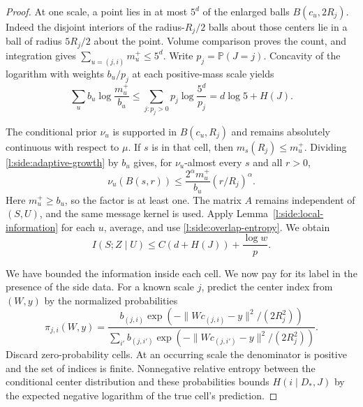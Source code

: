 \begin{proof}
At one scale, a point lies in at most $5^d$ of the enlarged balls
$B(c_u,2R_j)$.  Indeed the disjoint interiors of the radius-$R_j/2$
balls about those centers lie in a ball of radius $5R_j/2$ about the
point.  Volume comparison proves the count, and integration gives
$\sum_{u=(j,i)}m_u^+\le5^d$.  Write $p_j=\mathbb P(J=j)$.  Concavity of
the logarithm with weights $b_u/p_j$ at each positive-mass scale yields
\begin{equation}\label{l:side:overlap-entropy}
 \sum_u b_u\log\frac{m_u^+}{b_u}
 \le\sum_{j:p_j>0}p_j\log\frac{5^d}{p_j}
 =d\log5+H(J).
\end{equation}

The conditional prior $\nu_u$ is supported in $B(c_u,R_j)$ and remains
absolutely continuous with respect to $\mu$.  If $s$ is in that cell,
then $m_s(R_j)\le m_u^+$.  Dividing \eqref{l:side:adaptive-growth} by
$b_u$ gives, for $\nu_u$-almost every $s$ and all $r>0$,
\[
 \nu_u(B(s,r))\le
 \frac{2^\alpha m_u^+}{b_u}(r/R_j)^\alpha.
\]
Here $m_u^+\ge b_u$, so the factor is at least one.  The matrix $A$
remains independent of $(S,U)$, and the same message kernel is used.
Apply Lemma~\ref{l:side:local-information} for each $u$, average, and use
\eqref{l:side:overlap-entropy}.  We obtain
\begin{equation}\label{l:side:information-in-cell}
 I(S;Z\mid U)\le C(d+H(J))+\frac{\log w}{p}.
\end{equation}

We have bounded the information inside each cell.  We now pay for its
label in the presence of the side data.  For a known scale $j$, predict
the center index from $(W,y)$ by the normalized probabilities
\begin{equation}\label{l:side:predictor}
 \pi_{j,i}(W,y)=
 \frac{b_{(j,i)}\exp(-\|Wc_{(j,i)}-y\|^2/(2R_j^2))}
 {\displaystyle\sum_{i'}b_{(j,i')}
       \exp(-\|Wc_{(j,i')}-y\|^2/(2R_j^2))}.
\end{equation}
Discard zero-probability cells.  At an occurring scale the denominator
is positive and the set of indices is finite.  Nonnegative relative
entropy between the conditional center distribution and these
probabilities bounds $H(i\mid D_*,J)$ by the expected negative logarithm
of the true cell's prediction.


\end{proof}
